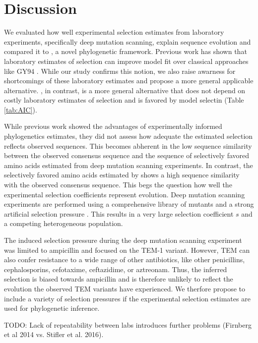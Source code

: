 \documentclass[12pt]{article}
\begin{document}
\section*{Discussion}

We evaluated how well experimental selection estimates from laboratory experiments, specifically deep mutation scanning, explain sequence evolution and compared it to \selac, a novel phylogenetic framework.
Previous work has shown that laboratory estimates of selection can improve model fit over classical approaches like GY94 \citep{bloom2014, bloom2017}.
While our study confirms this notion, we also raise awarness for shortcomings of these laboratory estimates and propose a more general applicable alternative.
\selac, in contrast, is a more general alternative that does not depend on costly laboratory estimates of selection and is favored by model selectin (Table \ref{tab:AIC}).

While previous work showed the advantages of experimentally informed phylogenetics estimates, they did not assess how adequate the estimated selection reflects observed sequences.
This becomes abherent in the low sequence similarity between the observed consensus sequence and the sequence of selectively favored amino acids estimated from deep mutation scanning experiments.
In contrast, the selectively favored amino acids estimated by \selac shows a high sequence similarity with the observed consensus sequence.
This begs the question how well the experimental selection coefficients represent evolution.
Deep mutation scanning experiments are performed using a comprehensive library of mutants and a strong artificial selection pressure \citep{FirnbergAndOstermeier2012, Jain2014, FowlerAndFields2014, Fowler2014}.
This results in a very large selection coefficient $s$ and a competing heterogeneous population.

The induced selection pressure during the deep mutation scanning experiment was limited to ampicillin \citep{stiffler2016} and focused on the TEM-1 variant.
However, TEM can also confer resistance to a wide range of other antibiotics, like other penicillins, cephalosporins, cefotaxime, ceftazidime, or aztreonam.
Thus, the inferred selection is biased towards ampicillin and is therefore unlikely to reflect the evolution the observed TEM variants have experienced.
We therfore propose to include a variety of selection pressures if the experimental selection estimates are used for phylogenetic inference.

TODO:  Lack of repeatability between labs introduces further problems (Firnberg et al 2014 vs. Stifler et al. 2016).
\end{document}
